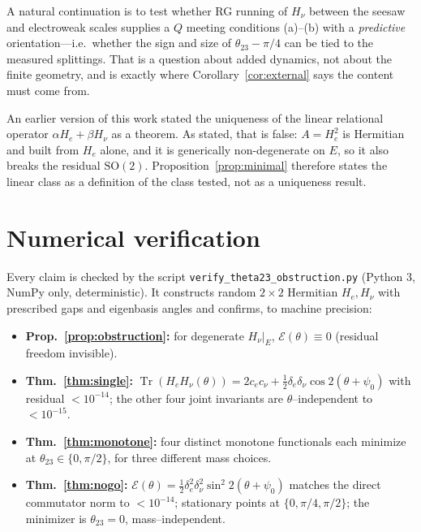 \documentclass[11pt,a4paper]{article}
\theoremstyle{definition}
\newcommand{\He}{H_e}
\newcommand{\Hnu}{H_\nu}
\newcommand{\Tr}{\operatorname{Tr}}
\begin{document}
A natural continuation is to test whether RG running of $\Hnu$ between the seesaw
and electroweak scales supplies a $Q$ meeting conditions (a)--(b) with a
\emph{predictive} orientation---i.e.\ whether the sign and size of
$\theta_{23}-\pi/4$ can be tied to the measured splittings. That is a question about
added dynamics, not about the finite geometry, and is exactly where
Corollary~\ref{cor:external} says the content must come from.



An earlier version of this work stated the uniqueness of the linear relational operator
$\alpha\He+\beta\Hnu$ as a theorem. As stated, that is false: $A=\He^2$ is Hermitian and built from
$\He$ alone, and it is generically non-degenerate on $E$, so it also breaks the residual
$\mathrm{SO}(2)$. Proposition~\ref{prop:minimal} therefore states the linear class as a definition
of the class tested, not as a uniqueness result.

\appendix
\section{Numerical verification}\label{app:numeric}

Every claim is checked by the script
\texttt{verify\_theta23\_obstruction.py} (Python 3, NumPy only, deterministic).
It constructs random $2\times2$ Hermitian $\He,\Hnu$ with prescribed gaps and
eigenbasis angles and confirms, to machine precision:
\begin{itemize}
\item \textbf{Prop.~\ref{prop:obstruction}:} for degenerate $\Hnu|_E$,
$\mathcal E(\theta)\equiv0$ (residual freedom invisible).
\item \textbf{Thm.~\ref{thm:single}:}
$\Tr(\He\Hnu(\theta))=2c_ec_\nu+\tfrac12\delta_e\delta_\nu\cos2(\theta+\psi_0)$ with
residual $<10^{-14}$; the other four joint invariants are $\theta$--independent to
$<10^{-15}$.
\item \textbf{Thm.~\ref{thm:monotone}:} four distinct monotone functionals each
minimize at $\theta_{23}\in\{0,\pi/2\}$, for three different mass choices.
\item \textbf{Thm.~\ref{thm:nogo}:}
$\mathcal E(\theta)=\tfrac12\delta_e^2\delta_\nu^2\sin^2 2(\theta+\psi_0)$ matches the
direct commutator norm to $<10^{-14}$; stationary points at $\{0,\pi/4,\pi/2\}$;
the minimizer is $\theta_{23}=0$, mass--independent.
\end{itemize}
\end{document}

